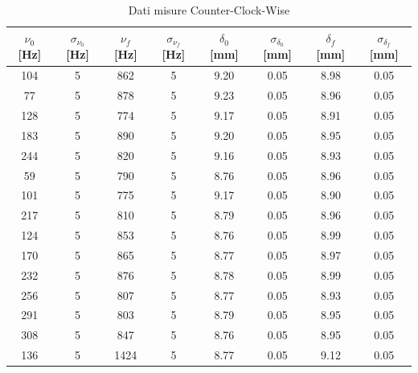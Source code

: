 \documentclass{article}
\begin{document}
            \begin{table}[H]

                \centering
                \begin{tabular}{c c c c c c c c} 

                    \toprule
                    $\nu_0$ [Hz] & $\sigma_{\nu_0}$ [Hz] & $\nu_f$ [Hz] &  $\sigma_{\nu_f}$ [Hz] & 
                    $\delta_0$ [mm] & $\sigma_{\delta_0}$ [mm] & $\delta_f$ [mm] & $\sigma_{\delta_f}$ [mm] \\ 
                    
                    \midrule
                    104 & 5 & 862 &  5 & 9.20 & 0.05 & 8.98 & 0.05  \\ 
                    77  & 5 & 878 &  5 & 9.23 & 0.05 & 8.96 & 0.05  \\ 
                    128 & 5 & 774 &  5 & 9.17 & 0.05 & 8.91 & 0.05  \\
                    183 & 5 & 890 &  5 & 9.20 & 0.05 & 8.95 & 0.05  \\ 
                    244 & 5 & 820 &  5 & 9.16 & 0.05 & 8.93 & 0.05  \\ 
                    59  & 5 & 790 &  5 & 8.76 & 0.05 & 8.96 & 0.05  \\ 
                    101 & 5 & 775 &  5 & 9.17 & 0.05 & 8.90 & 0.05  \\ 
                    217 & 5 & 810 &  5 & 8.79 & 0.05 & 8.96 & 0.05  \\ 
                    124 & 5 & 853 &  5 & 8.76 & 0.05 & 8.99 & 0.05  \\ 
                    170 & 5 & 865 &  5 & 8.77 & 0.05 & 8.97 & 0.05  \\ 
                    232 & 5 & 876 &  5 & 8.78 & 0.05 & 8.99 & 0.05  \\ 
                    256 & 5 & 807 &  5 & 8.77 & 0.05 & 8.93 & 0.05  \\ 
                    291 & 5 & 803 &  5 & 8.79 & 0.05 & 8.95 & 0.05  \\ 
                    308 & 5 & 847 &  5 & 8.76 & 0.05 & 8.95 & 0.05  \\ 
                    136 & 5 & 1424 & 5 & 8.77 & 0.05 & 9.12 & 0.05  \\ 
                    \bottomrule           
                
                \end{tabular}
                \caption{Dati misure Counter-Clock-Wise}

            \end{table}
\end{document}
